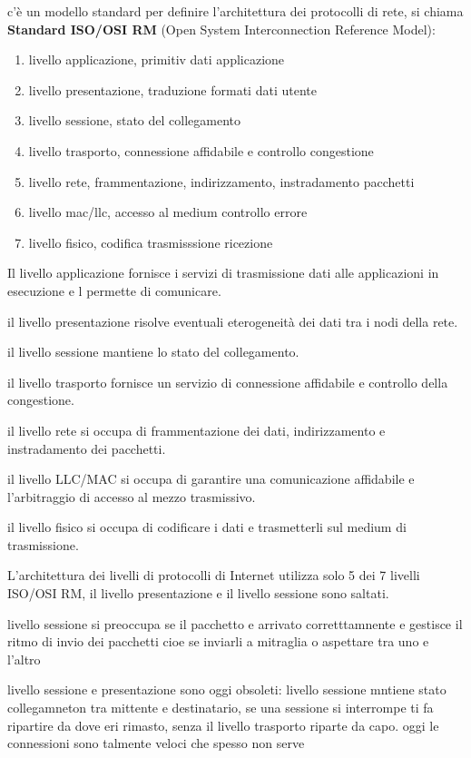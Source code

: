 \documentclass[12pt]{article}
\begin{document}
c'è un modello standard per definire l'architettura dei protocolli di rete, si chiama \textbf{Standard ISO/OSI RM} (Open System Interconnection Reference Model):

\begin{enumerate}
\item[7.] livello applicazione, primitiv dati applicazione
\item[6.] livello presentazione, traduzione formati dati utente
\item[5.] livello sessione, stato del collegamento
\item[4.] livello trasporto, connessione affidabile e controllo congestione
\item[3.] livello rete, frammentazione, indirizzamento, instradamento pacchetti
\item[2.] livello mac/llc, accesso al medium controllo errore
\item[1.] livello fisico, codifica trasmisssione ricezione
\end{enumerate}

Il livello applicazione fornisce i servizi di trasmissione dati alle applicazioni in esecuzione e l permette di comunicare.

il livello presentazione risolve eventuali eterogeneità dei dati tra i nodi della rete.

il livello sessione mantiene lo stato del collegamento. 

il livello trasporto fornisce un servizio di connessione affidabile e controllo della
congestione. 

il livello rete si occupa di frammentazione dei dati, indirizzamento e instradamento dei
pacchetti. 

il livello LLC/MAC si occupa di garantire una comunicazione affidabile e l’arbitraggio di accesso
al mezzo trasmissivo. 

il livello fisico si occupa di codificare i dati e trasmetterli sul medium di
trasmissione.


L’architettura dei livelli di protocolli di Internet utilizza solo 5 dei 7 livelli ISO/OSI RM, il livello presentazione e il livello sessione sono saltati.

livello sessione si preoccupa se il pacchetto e arrivato corretttamnente e gestisce il ritmo di invio dei pacchetti cioe se inviarli a mitraglia o aspettare tra uno e l’altro

livello sessione e presentazione sono oggi obsoleti: livello sessione mntiene stato collegamneton tra mittente e destinatario, se una sessione si interrompe ti fa ripartire da dove eri rimasto, senza il livello trasporto riparte da capo. oggi le connessioni sono talmente veloci che spesso non serve
\end{document}
